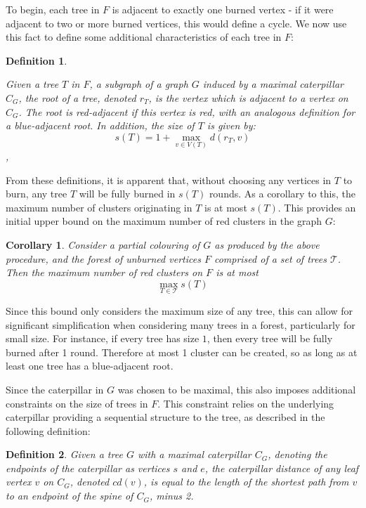 \documentclass{mpaper}
\newtheorem{definition}{Definition}[section]
\newtheorem{corollary}{Corollary}[section]
\begin{document}
To begin, each tree in $F$ is adjacent to exactly one burned vertex - if it were adjacent to two or more burned vertices, this would define a cycle. We now use this fact to define some additional characteristics of each tree in $F$:

\begin{definition}
\label{def/roots}

Given a tree $T$ in $F$, a subgraph of a graph $G$ induced by a maximal caterpillar $C_G$, the \emph{root} of a tree, denoted $r_T$, is the vertex which is adjacent to a vertex on $C_G$. The root is \emph{red-adjacent} if this vertex is red, with an analogous definition for a \emph{blue-adjacent} root. In addition, the \emph{size} of $T$ is given by: $$s(T) = 1 + \max_{v \in V(T)} d(r_{T},v)$$, 
 

\end{definition}

From these definitions, it is apparent that, without choosing any vertices in $T$ to burn, any tree $T$ will be fully burned in $s(T)$ rounds. As a corollary to this, the maximum number of clusters originating in $T$ is at most $s(T)$. This provides an initial upper bound on the maximum number of red clusters in the graph $G$:

\begin{corollary}
\label{cor/root-diameter-bound-1}
Consider a partial colouring of $G$ as produced by the above procedure, and the forest of unburned vertices $F$ comprised of a set of trees $\mathcal{T}$. Then the maximum number of red clusters on $F$ is at most $$\max_{T \in \mathcal{T}} s(T)$$
\end{corollary}

Since this bound only considers the maximum size of any tree, this can allow for significant simplification when considering many trees in a forest, particularly for small size. For instance, if every tree has size $1$, then every tree will be fully burned after 1 round. Therefore at most 1 cluster can be created, so as long as at least one tree has a blue-adjacent root.

Since the caterpillar in $G$ was chosen to be maximal, this also imposes additional constraints on the size of trees in $F$. This constraint relies on the underlying caterpillar providing a sequential structure to the tree, as described in the following definition:

\begin{definition}
\label{def/tree-distance}
Given a tree $G$ with a maximal caterpillar $C_G$, denoting the endpoints of the caterpillar as vertices $s$ and $e$, the \emph{caterpillar distance} of any leaf vertex $v$ on $C_G$, denoted $cd(v)$, is equal to the length of the shortest path from $v$ to an endpoint of the spine of $C_G$, minus 2.
\end{definition}
\end{document}
